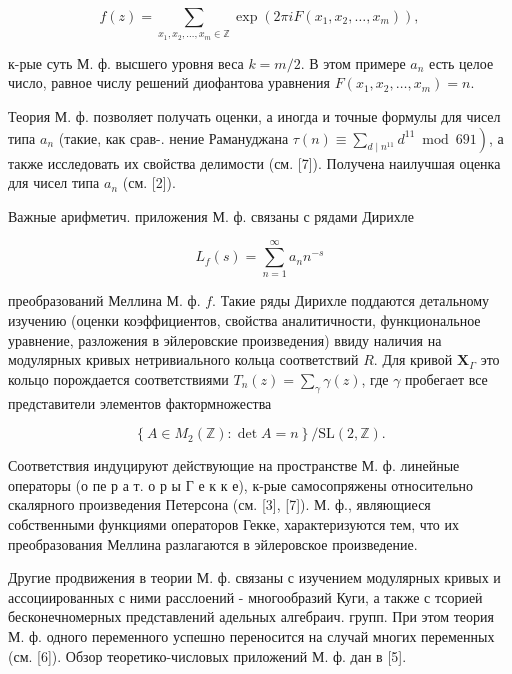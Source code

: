 \documentclass[10pt]{article}
\begin{document}
\[

f(z)=\sum_{x_{1}, x_{2}, \ldots, x_{m} \in \mathbb{Z}} \exp \left(2 \pi i F\left(x_{1}, x_{2}, \ldots, x_{m}\right)\right),

\]



к-рые суть М. ф. высшего уровня веса $k=m / 2$. В этом примере $a_{n}$ есть целое число, равное числу решений диофантова уравнения $F\left(x_{1}, x_{2}, \ldots, x_{m}\right)=n$.



Теория М. ф. позволяет получать оценки, а иногда и точные формулы для чисел типа $a_{n}$ (такие, как срав-. нение Рамануджана $\left.\tau(n) \equiv \sum_{d \mid n^{11}} d^{11} \bmod 691\right)$, а также исследовать их свойства делимости (см. [7]). Получена наилучшая оценка для чисел типа $a_{n}$ (см. [2]).



Важные арифметич. приложения М. ф. связаны с рядами Дирихле



\[

L_{f}(s)=\sum_{n=1}^{\infty} a_{n} n^{-s}

\]



преобразований Меллина М. ф. $f$. Такие ряды Дирихле поддаются детальному изучению (оценки коэффициентов, свойства аналитичности, функциональное уравнение, разложения в эйлеровские произведения) ввиду наличия на модулярных кривых нетривиального кольца соответствий $R$. Для кривой $\boldsymbol{X}_{\Gamma}$ это кольцо порождается соответствиями $T_{n}(z)=\sum_{\gamma} \gamma(z)$, где $\gamma$ пробегает все представители элементов фактормножества



\[

\left\{A \in M_{2}(\mathbb{Z}): \operatorname{det} A=n\right\} / \mathrm{SL}(2, \mathbb{Z}) .

\]



Соответствия индуцируют действующие на пространстве М. ф. линейные операторы (о пе р а т. о р ы Г е к к е), к-рые самосопряжены относительно скалярного произведения Петерсона (см. [3], [7]). М. ф., являющиеся собственными функциями операторов Гекке, характеризуются тем, что их преобразования Меллина разлагаются в эйлеровское произведение.



Другие продвижения в теории М. ф. связаны с изучением модулярных кривых и ассоциированных с ними расслоений - многообразий Куги, а также с тсориеӥ бесконечномерных представлений адельных алгебраич. групп. При этом теория М. ф. одного переменного успешно переносится на случай многих переменных (см. [6]). Обзор теоретико-числовых приложений М. ф. дан в [5].
\end{document}

